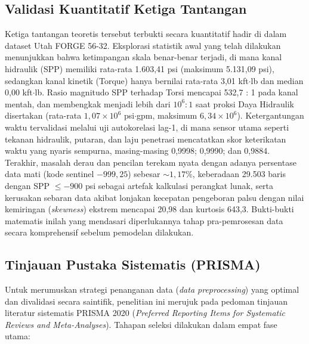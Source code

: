 \documentclass[conference]{IEEEtran}
\begin{document}
\subsection{Validasi Kuantitatif Ketiga Tantangan}
Ketiga tantangan teoretis tersebut terbukti secara kuantitatif hadir di dalam dataset Utah FORGE 56-32. Eksplorasi statistik awal yang telah dilakukan menunjukkan bahwa ketimpangan skala benar-benar terjadi, di mana kanal hidraulik (SPP) memiliki rata-rata 1.603,41 psi (maksimum 5.131,09 psi), sedangkan kanal kinetik (Torque) hanya bernilai rata-rata 3,01 kft$\cdot$lb dan median 0,00 kft$\cdot$lb. Rasio magnitudo SPP terhadap Torsi mencapai 532,7 : 1 pada kanal mentah, dan membengkak menjadi lebih dari $10^6 : 1$ saat proksi Daya Hidraulik disertakan (rata-rata $1{,}07 \times 10^6$ psi$\cdot$gpm, maksimum $6{,}34 \times 10^6$). Ketergantungan waktu tervalidasi melalui uji autokorelasi lag-1, di mana sensor utama seperti tekanan hidraulik, putaran, dan laju penetrasi mencatatkan skor keterikatan waktu yang nyaris sempurna, masing-masing 0,9998; 0,9990; dan 0,9884. Terakhir, masalah derau dan pencilan terekam nyata dengan adanya persentase data mati (kode sentinel $-999{,}25$) sebesar $\sim 1{,}17\%$, keberadaan 29.503 baris dengan SPP $\le -900$ psi sebagai artefak kalkulasi perangkat lunak, serta kerusakan sebaran data akibat lonjakan kecepatan pengeboran palsu dengan nilai kemiringan (\textit{skewness}) ekstrem mencapai 20,98 dan kurtosis 643,3. Bukti-bukti matematis inilah yang mendasari diperlukannya tahap pra-pemrosesan data secara komprehensif sebelum pemodelan dilakukan.

\subsection{Tinjauan Pustaka Sistematis (PRISMA)}
Untuk merumuskan strategi penanganan data (\textit{data preprocessing}) yang optimal dan divalidasi secara saintifik, penelitian ini merujuk pada pedoman tinjauan literatur sistematis PRISMA 2020 (\textit{Preferred Reporting Items for Systematic Reviews and Meta-Analyses}). Tahapan seleksi dilakukan dalam empat fase utama:
\end{document}
